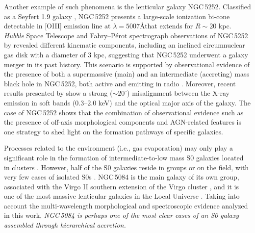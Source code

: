 \documentclass[modern]{aastex631}
\begin{document}
Another example of such phenomena is the lenticular galaxy NGC\,5252. Classified as a Seyfert 1.9 galaxy \citep{argyle+1990mnras243_504, osterbrock+1993apj414_552}, NGC\,5252 presents a large-scale ionization bi-cone \citep{tadhunter+1989nat341_422} detectable in [OIII] emission line at $\lambda=5007$\AA that extends for $R\sim20$ kpc. \emph{Hubble} Space Telescope and Fabry--P\'{e}rot spectrograph observations of NGC\,5252 by \citet{morse+1998apj505_159} revealed different kinematic components, including an inclined circumnuclear gas disk with a diameter of 3 kpc, suggesting that NGC\,5252 underwent a galaxy merger in its past history. This scenario is supported by observational evidence of the presence of both a supermassive (main) and an intermediate (accreting) mass black hole in NGC\,5252, both active and emitting in radio \citep{kim+2015apj814_8, kim+2017apj844_21, yang+2017mnras464_70}. Moreover, recent results presented by \citet{wang+2024arXiv2401.09172} show a strong ($\sim20^{\circ}$) misalignment between the X-ray emission in soft bands (0.3--2.0 keV) and the optical major axis of the galaxy. The case of NGC\,5252 shows that the combination of observational evidence such as the presence of off-axis morphological components and AGN-related features is one strategy to shed light on the formation pathways of specific galaxies. 


Processes related to the environment (i.e., gas evaporation) may only play a significant role in the formation of intermediate-to-low mass S0 galaxies located in clusters \citep{vollmer+2012aap537_143, cerulo+2017mnras472_254}. However, half of the S0 galaxies reside in groups or on the field, with very few cases of isolated S0s \citep{khim+2015apj220_3}. NGC\,5084 is the main galaxy of its own group, associated with the Virgo II southern extension of the Virgo cluster \citep{tully1982apj257_389}, and it is one of the most massive lenticular galaxies in the Local Universe \citep[more massive than 98\% of the S0 galaxies]{ohlson+2024aj167_31}. Taking into account the multi-wavelength morphological and spectroscopic evidence analyzed in this work, \emph{NGC\,5084 is perhaps one of the most clear cases of an S0 galaxy assembled through hierarchical accretion.}
\end{document}
